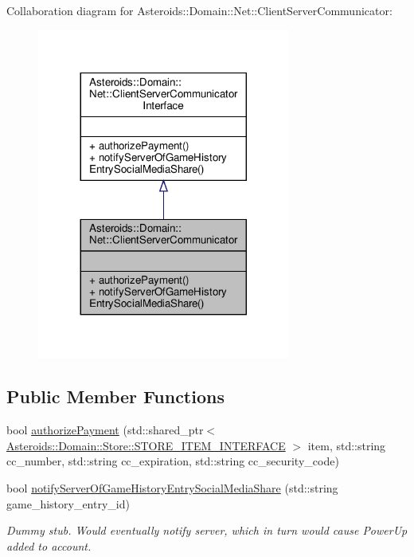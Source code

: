 Collaboration diagram for Asteroids\+:\+:Domain\+:\+:Net\+:\+:Client\+Server\+Communicator\+:\nopagebreak
\begin{figure}[H]
\begin{center}
\leavevmode
\includegraphics[width=236pt]{classAsteroids_1_1Domain_1_1Net_1_1ClientServerCommunicator__coll__graph}
\end{center}
\end{figure}
\subsection*{Public Member Functions}
\begin{DoxyCompactItemize}
\item 
bool \hyperlink{classAsteroids_1_1Domain_1_1Net_1_1ClientServerCommunicator_abf768675ef72169877377e923510e9a5}{authorize\+Payment} (std\+::shared\+\_\+ptr$<$ \hyperlink{classAsteroids_1_1Domain_1_1Store_1_1STORE__ITEM__INTERFACE}{Asteroids\+::\+Domain\+::\+Store\+::\+S\+T\+O\+R\+E\+\_\+\+I\+T\+E\+M\+\_\+\+I\+N\+T\+E\+R\+F\+A\+CE} $>$ item, std\+::string cc\+\_\+number, std\+::string cc\+\_\+expiration, std\+::string cc\+\_\+security\+\_\+code)
\item 
bool \hyperlink{classAsteroids_1_1Domain_1_1Net_1_1ClientServerCommunicator_a1910e3929adb473f705b82b793dff450}{notify\+Server\+Of\+Game\+History\+Entry\+Social\+Media\+Share} (std\+::string game\+\_\+history\+\_\+entry\+\_\+id)
\begin{DoxyCompactList}\small\item\em Dummy stub. Would eventually notify server, which in turn would cause Power\+Up added to account. \end{DoxyCompactList}\end{DoxyCompactItemize}


